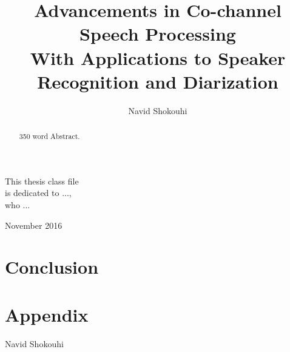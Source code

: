 \documentclass[doublespacing]{utdthesis}
\author{Navid Shokouhi}
\title{Advancements in Co-channel Speech Processing \\
	With Applications to Speaker Recognition and Diarization}
\begin{document}
\frontmatter

\signaturepage

\begin{dedication} %
This thesis class file \\
is dedicated to ..., \\
who ...
\end{dedication}

\maketitle

\begin{acks}{November 2016} %


\end{acks}

\begin{preface} %
\end{preface}

\begin{abstract}
350 word Abstract.

\end{abstract}

\tableofcontents
\listoffigures %
\listoftables %

\mainmatter











\chapter{Conclusion}
\label{c:conclude}



\chapter*{Appendix}
\label{a:other}

\begin{thesisbib}

\end{thesisbib}  %

\begin{vita}
Navid Shokouhi
\end{vita}
\end{document}
